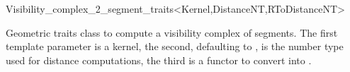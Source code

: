 
\begin{ccRefClass}{Visibility_complex_2_segment_traits<Kernel,DistanceNT,RToDistanceNT>}

\ccDefinition

Geometric traits class to compute a visibility complex of segments. The first
template parameter is a kernel, the second, defaulting to , is
the number type used for distance computations, the third is a functor to
convert  into .



\ccIsModel
{}

\ccSeeAlso

\\
\\
\\

\ccTagDefaults
\end{ccRefClass}
\ccRefPageEnd

